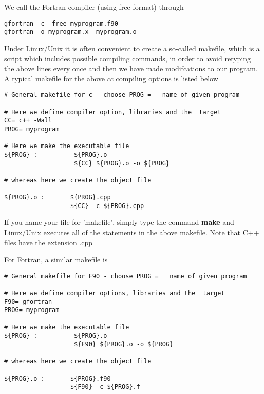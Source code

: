 We call the Fortran compiler (using free format) through 
\begin{tcolorbox}
\begin{verbatim}
gfortran -c -free myprogram.f90
gfortran -o myprogram.x  myprogram.o
\end{verbatim}
\end{tcolorbox}
Under Linux/Unix it is often convenient to create a
so-called makefile, which is a script which includes possible
compiling commands, in order to avoid retyping the above lines
every once and then we have made modifcations to our program.
A typical makefile for the above $cc$ compiling options is listed
below
\begin{tcolorbox}
\begin{verbatim}
# General makefile for c - choose PROG =   name of given program

# Here we define compiler option, libraries and the  target
CC= c++ -Wall
PROG= myprogram

# Here we make the executable file 
${PROG} :          ${PROG}.o
                   ${CC} ${PROG}.o -o ${PROG}

# whereas here we create the object file

${PROG}.o :       ${PROG}.cpp
                  ${CC} -c ${PROG}.cpp

\end{verbatim}   
\end{tcolorbox}                                            
If you name your file for 'makefile', simply type the command
{\bf make} and Linux/Unix executes all of the statements in the above
makefile. Note that C++ files have the extension .cpp

For Fortran, a similar makefile is
\begin{tcolorbox}
\begin{verbatim}
# General makefile for F90 - choose PROG =   name of given program

# Here we define compiler options, libraries and the  target
F90= gfortran 
PROG= myprogram

# Here we make the executable file 
${PROG} :          ${PROG}.o
                   ${F90} ${PROG}.o -o ${PROG}

# whereas here we create the object file

${PROG}.o :       ${PROG}.f90
                  ${F90} -c ${PROG}.f
\end{verbatim}                                               
\end{tcolorbox}

